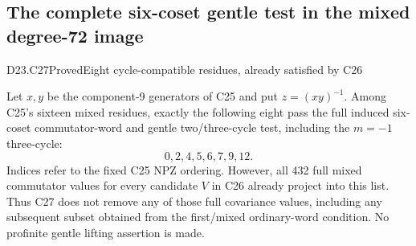 \subsection{The complete six-coset gentle test in the mixed degree-72 image}

\begin{statement}{D23.C27}{Proved}{Eight cycle-compatible residues, already satisfied by C26}
\end{statement}
Let $x,y$ be the component-9 generators of C25 and put
$z=(xy)^{-1}$. Among C25's sixteen mixed residues, exactly
the following eight pass the full induced six-coset
commutator-word and gentle two/three-cycle test, including
the $m=-1$ three-cycle:
\[
                   0,2,4,5,6,7,9,12.                      \tag{D23.C27.1}
\]
Indices refer to the fixed C25 NPZ ordering.  However, all
432 full mixed commutator values for every candidate $V$
in C26 already project into this list.  Thus C27 does not
remove any of those full covariance values, including any
subsequent subset obtained from the first/mixed ordinary-word
condition.  No profinite gentle lifting assertion is made.

